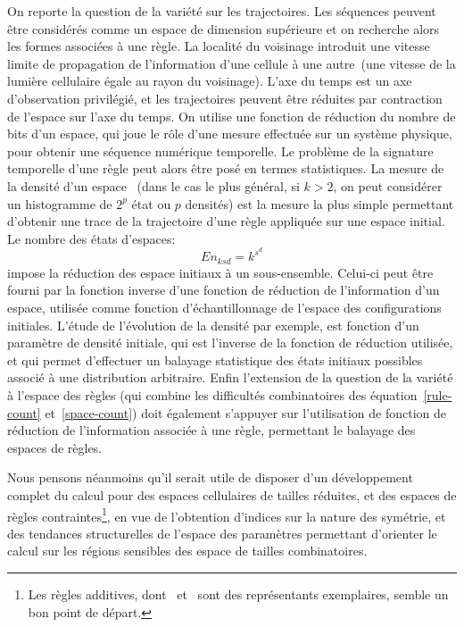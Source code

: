 On reporte la question de la vari\'et\'e sur les trajectoires. %
Les s\'equences peuvent \^etre consid\'er\'es comme un espace de dimension
sup\'erieure et on recherche alors les formes
associ\'ees \`a une r\`egle. %
La localit\'e du voisinage introduit une vitesse limite de propagation
de l'information d'une cellule \`a une autre~(une vitesse de la lumi\`ere
cellulaire \'egale au rayon du voisinage). %
L'axe du temps est un axe d'observation privil\'egi\'e, et les trajectoires
peuvent \^etre r\'eduites par contraction de l'espace sur l'axe du temps. %
On utilise une fonction de r\'eduction du nombre de bits d'un espace,
qui joue le r\^ole d'une mesure effectu\'ee sur un syst\`eme physique, %
pour obtenir une s\'equence num\'erique temporelle. %
Le probl\`eme de la signature temporelle d'une r\`egle peut alors \^etre
pos\'e en termes statistiques. %
La mesure de la densit\'e d'un espace~%
(dans le cas le plus g\'en\'eral, si $k > 2$, on peut consid\'erer un
histogramme de $2^p$ \'etat ou $p$ densit\'es) %
est la mesure la plus simple permettant d'obtenir une trace de la
trajectoire d'une r\`egle appliqu\'ee sur une espace initial. %
Le nombre des \'etats d'espaces:
\begin{equation}
  En_{ksd} = k^{s^d}
  \label{space-count}
\end{equation}
impose la r\'eduction des espace initiaux \`a un sous-ensemble. %
Celui-ci peut \^etre fourni par la fonction inverse d'une fonction de
r\'eduction de l'information d'un espace, utilis\'ee comme fonction
d'\'echantillonnage de l'espace des configurations initiales. %
L'\'etude de l'\'evolution de la densit\'e par exemple, est fonction d'un
param\`etre de densit\'e initiale, qui est l'inverse de la fonction de
r\'eduction utilis\'ee, et qui permet d'effectuer un balayage statistique
des \'etats initiaux possibles associ\'e \`a une distribution arbitraire. %
Enfin l'extension de la question de la vari\'et\'e \`a l'espace des r\`egles
(qui combine les difficult\'es combinatoires des \'equation~\ref{rule-count}
et~\ref{space-count}) doit \'egalement s'appuyer sur l'utilisation de
fonction de r\'eduction de l'information associ\'ee \`a une r\`egle, permettant
le balayage des espaces de r\`egles. %

Nous pensons n\'eanmoins qu'il serait utile de disposer d'un
d\'eveloppement complet du calcul pour des espaces cellulaires de
tailles r\'eduites, et des espaces de r\`egles contraintes\footnote{%
  Les r\`egles additives, dont~ et~ sont des
  repr\'esentants exemplaires, semble un bon point de d\'epart.}, %
en vue de l'obtention d'indices sur la nature des sym\'etrie, et des
tendances structurelles de l'espace des param\`etres permettant d'orienter
le calcul sur les r\'egions sensibles des espace de tailles
combinatoires. %

